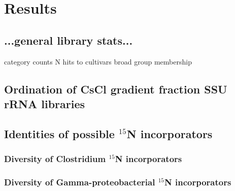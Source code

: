 \section{Results}

\subsection{...general library stats...}
category counts
N hits to cultivars
broad group membership
\subsection{Ordination of CsCl gradient fraction SSU rRNA libraries}
\subsection{Identities of possible $^{15}$N incorporators}
\subsubsection{Diversity of Clostridium $^{15}$N incorporators}
\subsubsection{Diversity of Gamma-proteobacterial $^{15}$N incorporators}



